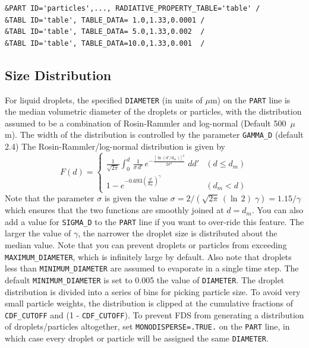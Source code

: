 \documentclass[11pt]{book}
\newcommand{\ct}{\tt\small}
\newcommand{\be}{\begin{equation}}
\newcommand{\ee}{\end{equation}}
\begin{document}
\footnotesize
\begin{verbatim}
&PART ID='particles',..., RADIATIVE_PROPERTY_TABLE='table' /
&TABL ID='table', TABLE_DATA= 1.0,1.33,0.0001 /
&TABL ID='table', TABLE_DATA= 5.0,1.33,0.002  /
&TABL ID='table', TABLE_DATA=10.0,1.33,0.001  /
\end{verbatim} \normalsize
\normalsize


\subsection{Size Distribution}
\label{info:particle_size}

For liquid droplets, the specified {\ct DIAMETER} (in units of $\mu$m) on the {\ct PART} line is the median volumetric diameter of the droplets or particles, with the
distribution assumed to be a combination of Rosin-Rammler and log-normal (Default 500~$\mu$m). The
width of the distribution is controlled by the parameter {\ct GAMMA\_D} (default 2.4)
The Rosin-Rammler/log-normal distribution is given by
\be F(d) = \left\{ \begin{array}{ll}
   \frac{1}{\sqrt{2\pi}} {\displaystyle \int_0^d} \, \frac{1}{\sigma\, d'} \,
   e^{-\frac{[\ln(d'/d_m)]^2}{2\sigma^2}} \; dd'       & (d \le d_m) \\
   1 - e^{-0.693 \left(\frac{d}{d_m}\right)^\gamma }  & (d_m < d)
   \end{array} \right.
\ee
Note that the parameter $\sigma$ is given the value
$\sigma=2/(\sqrt{2\pi} \, (\ln\,2) \; \gamma)=1.15/\gamma$
which ensures that the two functions are smoothly joined at $d=d_m$. You can also add a value for {\ct SIGMA\_D} to the {\ct PART} line if you want to
over-ride this feature.
The larger the value of $\gamma$, the narrower the droplet size is
distributed about the median value. Note that you can prevent droplets or particles from
exceeding {\ct MAXIMUM\_DIAMETER}, which is infinitely large by default. Also note that
droplets less than {\ct MINIMUM\_DIAMETER} are assumed to evaporate in a single time step. The default {\ct MINIMUM\_DIAMETER} is set to 0.005 the value of {\ct DIAMETER}.
The droplet distribution is divided into a series of bins for picking particle size.  To avoid very small particle weights, the distribution is clipped at the cumulative
fractions of {\ct CDF\_CUTOFF} and (1 - {\ct CDF\_CUTOFF}).
To prevent FDS from generating a distribution of droplets/particles altogether, set
{\ct MONODISPERSE=.TRUE.} on the {\ct PART} line, in which case every droplet or particle will be assigned the
same {\ct DIAMETER}.
\end{document}

